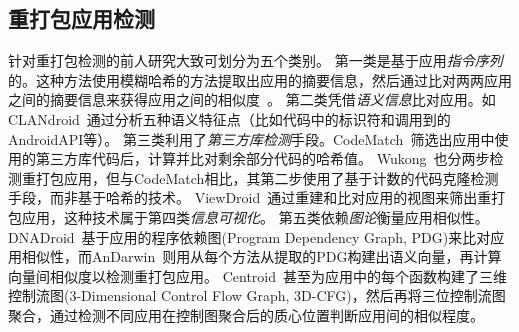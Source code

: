 \subsection{重打包应用检测}
针对重打包检测的前人研究大致可划分为五个类别。
第一类是基于应用\textit{指令序列}的。这种方法使用模糊哈希的方法提取出应用的摘要信息，然后通过比对两两应用之间的摘要信息来获得应用之间的相似度~\cite{DroidMOSS, Zheng2013DroidAnalyticsA}。
第二类凭借\textit{语义信息}比对应用。如CLANdroid~\cite{CLANdroid}通过分析五种语义特征点（比如代码中的标识符和调用到的AndroidAPI等）。
第三类利用了\textit{第三方库检测}手段。CodeMatch~\cite{CodeMatch}筛选出应用中使用的第三方库代码后，计算并比对剩余部分代码的哈希值。
Wukong~\cite{Wukong}也分两步检测重打包应用，但与CodeMatch相比，其第二步使用了基于计数的代码克隆检测手段，而非基于哈希的技术。
ViewDroid~\cite{ViewDroid}通过重建和比对应用的视图来筛出重打包应用，这种技术属于第四类\textit{信息可视化}。
第五类依赖\textit{图论}衡量应用相似性。
DNADroid~\cite{DNADroid}基于应用的程序依赖图(Program Dependency Graph, PDG)来比对应用相似性，而AnDarwin~\cite{AnDarwin}则用从每个方法从提取的PDG构建出语义向量，再计算向量间相似度以检测重打包应用。
Centroid~\cite{Centroid}甚至为应用中的每个函数构建了三维控制流图(3-Dimensional Control Flow Graph, 3D-CFG)，然后再将三位控制流图聚合，通过检测不同应用在控制图聚合后的质心位置判断应用间的相似程度。

